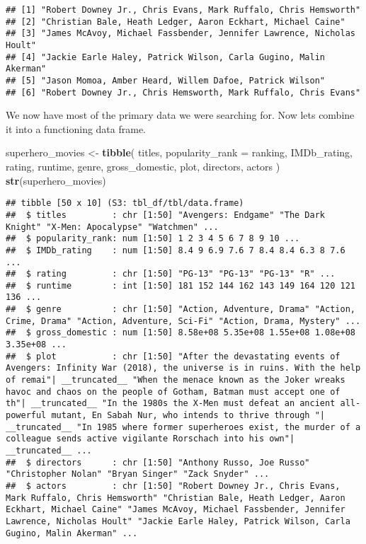 \documentclass[]{article}
\newenvironment{Shaded}{\begin{snugshade}}{\end{snugshade}}
\newcommand{\DataTypeTok}[1]{\textcolor[rgb]{0.13,0.29,0.53}{#1}}
\newcommand{\KeywordTok}[1]{\textcolor[rgb]{0.13,0.29,0.53}{\textbf{#1}}}
\newcommand{\NormalTok}[1]{#1}
\newcommand{\StringTok}[1]{\textcolor[rgb]{0.31,0.60,0.02}{#1}}
\begin{document}
\begin{verbatim}
## [1] "Robert Downey Jr., Chris Evans, Mark Ruffalo, Chris Hemsworth"      
## [2] "Christian Bale, Heath Ledger, Aaron Eckhart, Michael Caine"         
## [3] "James McAvoy, Michael Fassbender, Jennifer Lawrence, Nicholas Hoult"
## [4] "Jackie Earle Haley, Patrick Wilson, Carla Gugino, Malin Akerman"    
## [5] "Jason Momoa, Amber Heard, Willem Dafoe, Patrick Wilson"             
## [6] "Robert Downey Jr., Chris Hemsworth, Mark Ruffalo, Chris Evans"
\end{verbatim}

We now have most of the primary data we were searching for. Now lets
combine it into a functioning data frame.

\begin{Shaded}
\begin{Highlighting}[]
\NormalTok{superhero_movies <-}\StringTok{ }\KeywordTok{tibble}\NormalTok{(}
\NormalTok{  titles,}
  \DataTypeTok{popularity_rank =}\NormalTok{ ranking,}
\NormalTok{  IMDb_rating,}
\NormalTok{  rating,}
\NormalTok{  runtime,}
\NormalTok{  genre,}
\NormalTok{  gross_domestic,}
\NormalTok{  plot,}
\NormalTok{  directors,}
\NormalTok{  actors}
\NormalTok{)}
\KeywordTok{str}\NormalTok{(superhero_movies)}
\end{Highlighting}
\end{Shaded}

\begin{verbatim}
## tibble [50 x 10] (S3: tbl_df/tbl/data.frame)
##  $ titles         : chr [1:50] "Avengers: Endgame" "The Dark Knight" "X-Men: Apocalypse" "Watchmen" ...
##  $ popularity_rank: num [1:50] 1 2 3 4 5 6 7 8 9 10 ...
##  $ IMDb_rating    : num [1:50] 8.4 9 6.9 7.6 7 8.4 8.4 6.3 8 7.6 ...
##  $ rating         : chr [1:50] "PG-13" "PG-13" "PG-13" "R" ...
##  $ runtime        : int [1:50] 181 152 144 162 143 149 164 120 121 136 ...
##  $ genre          : chr [1:50] "Action, Adventure, Drama" "Action, Crime, Drama" "Action, Adventure, Sci-Fi" "Action, Drama, Mystery" ...
##  $ gross_domestic : num [1:50] 8.58e+08 5.35e+08 1.55e+08 1.08e+08 3.35e+08 ...
##  $ plot           : chr [1:50] "After the devastating events of Avengers: Infinity War (2018), the universe is in ruins. With the help of remai"| __truncated__ "When the menace known as the Joker wreaks havoc and chaos on the people of Gotham, Batman must accept one of th"| __truncated__ "In the 1980s the X-Men must defeat an ancient all-powerful mutant, En Sabah Nur, who intends to thrive through "| __truncated__ "In 1985 where former superheroes exist, the murder of a colleague sends active vigilante Rorschach into his own"| __truncated__ ...
##  $ directors      : chr [1:50] "Anthony Russo, Joe Russo" "Christopher Nolan" "Bryan Singer" "Zack Snyder" ...
##  $ actors         : chr [1:50] "Robert Downey Jr., Chris Evans, Mark Ruffalo, Chris Hemsworth" "Christian Bale, Heath Ledger, Aaron Eckhart, Michael Caine" "James McAvoy, Michael Fassbender, Jennifer Lawrence, Nicholas Hoult" "Jackie Earle Haley, Patrick Wilson, Carla Gugino, Malin Akerman" ...
\end{verbatim}
\end{document}
